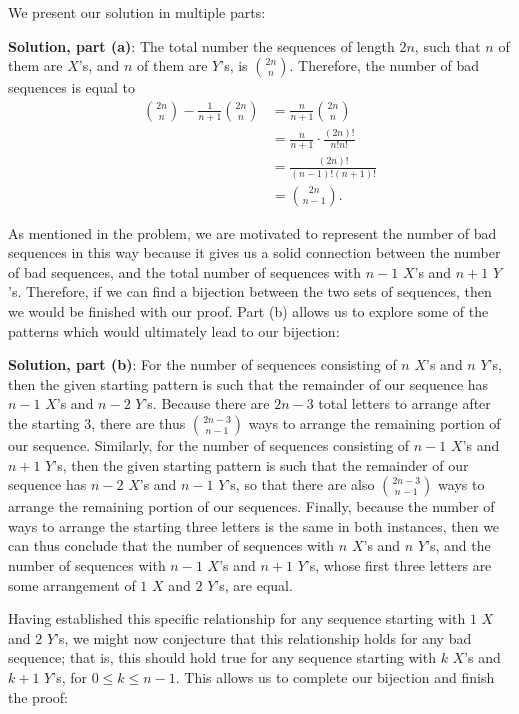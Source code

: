 \documentclass{article}
\newcommand{\V}{

\vspace{\baselineskip}

}
\begin{document}
We present our solution in multiple parts:\V

\begin{solution}
\textbf{Solution, part (a)}: The total number the sequences of length $2n$, such that $n$ of them are $X$'s, and $n$ of them are $Y$'s, is $\binom{2n}{n}$. Therefore, the number of bad sequences is equal to 
    \begin{align*}
        \binom{2n}{n} - \frac{1}{n+1}\binom{2n}{n} &= \frac{n}{n+1}\binom{2n}{n} \\
        &= \frac{n}{n+1}\cdot\frac{(2n)!}{n!n!} \\
        &= \frac{(2n)!}{(n-1)!(n+1)!} \\ 
        &= \binom{2n}{n-1}.
    \end{align*}
\end{solution}\V

As mentioned in the problem, we are motivated to represent the number of bad sequences in this way because it gives us a solid connection between the number of bad sequences, and the total number of sequences with $n-1$ $X$'s and $n+1$ $Y$'s. Therefore, if we can find a bijection between the two sets of sequences, then we would be finished with our proof. Part (b) allows us to explore some of the patterns which would ultimately lead to our bijection:\V

\begin{solution}
\textbf{Solution, part (b)}: For the number of sequences consisting of $n$ $X$'s and $n$ $Y$'s, then the given starting pattern is such that the remainder of our sequence has $n-1$ $X$'s and $n-2$ $Y$'s. Because there are $2n-3$ total letters to arrange after the starting $3$, there are thus $\binom{2n-3}{n-1}$ ways to arrange the remaining portion of our sequence. Similarly, for the number of sequences consisting of $n-1$ $X$'s and $n+1$ $Y$'s, then the given starting pattern is such that the remainder of our sequence has $n-2$ $X$'s and $n-1$ $Y$'s, so that there are also $\binom{2n-3}{n-1}$ ways to arrange the remaining portion of our sequences. Finally, because the number of ways to arrange the starting three letters is the same in both instances, then we can thus conclude that the number of sequences with $n$ $X$'s and $n$ $Y$'s, and the number of sequences with $n-1$ $X$'s and $n+1$ $Y$'s, whose first three letters are some arrangement of $1$ $X$ and $2$ $Y$'s, are equal.
\end{solution}\V

Having established this specific relationship for any sequence starting with $1$ $X$ and $2$ $Y$'s, we might now conjecture that this relationship holds for any bad sequence; that is, this should hold true for any sequence starting with $k$ $X$'s and $k+1$ $Y$'s, for $0\leq k\leq n-1$. This allows us to complete our bijection and finish the proof:\V
\end{document}

